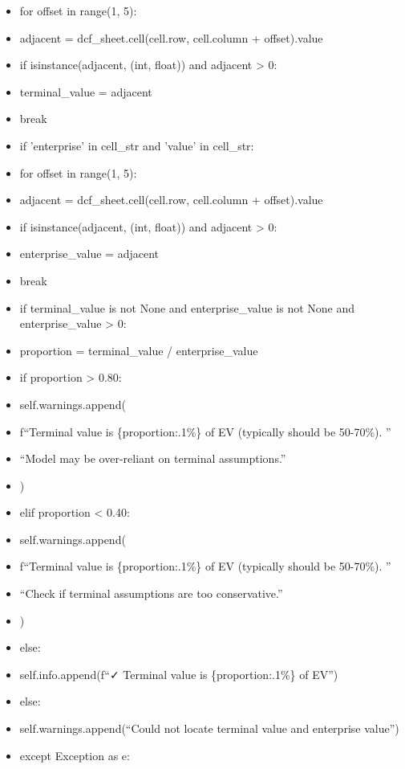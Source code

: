 \documentclass[11pt]{article}
\begin{document}
\begin{itemize}[leftmargin=*,itemsep=2pt,topsep=2pt]
\item {} for offset in range(1, 5):
\item {} adjacent = dcf\_\allowbreak{}sheet.cell(cell.row, cell.column + offset).value
\item {} if isinstance(adjacent, (int, float)) and adjacent > 0:
\item {} terminal\_\allowbreak{}value = adjacent
\item {} break
\item {} if 'enterprise' in cell\_\allowbreak{}str and 'value' in cell\_\allowbreak{}str:
\item {} for offset in range(1, 5):
\item {} adjacent = dcf\_\allowbreak{}sheet.cell(cell.row, cell.column + offset).value
\item {} if isinstance(adjacent, (int, float)) and adjacent > 0:
\item {} enterprise\_\allowbreak{}value = adjacent
\item {} break
\item {} if terminal\_\allowbreak{}value is not None and enterprise\_\allowbreak{}value is not None and enterprise\_\allowbreak{}value > 0:
\item {} proportion = terminal\_\allowbreak{}value / enterprise\_\allowbreak{}value
\item {} if proportion > 0.80:
\item {} self.warnings.append(
\item {} f``Terminal value is \{proportion:.1\%\} of EV (typically should be 50-70\%). ''
\item {} ``Model may be over-reliant on terminal assumptions.''
\item {} )
\item {} elif proportion < 0.40:
\item {} self.warnings.append(
\item {} f``Terminal value is \{proportion:.1\%\} of EV (typically should be 50-70\%). ''
\item {} ``Check if terminal assumptions are too conservative.''
\item {} )
\item {} else:
\item {} self.info.append(f``✓ Terminal value is \{proportion:.1\%\} of EV'')
\item {} else:
\item {} self.warnings.append(``Could not locate terminal value and enterprise value'')
\item {} except Exception as e:

\end{itemize}
\end{document}
